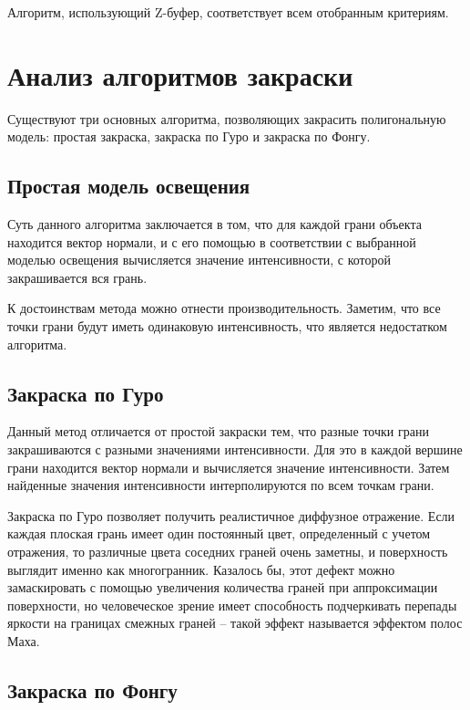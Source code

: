 Алгоритм, использующий Z-буфер, соответствует всем отобранным критериям.

\section{Анализ алгоритмов закраски}

Существуют три основных алгоритма, позволяющих закрасить полигональную модель: простая закраска, закраска по Гуро и закраска по Фонгу.

\subsection{Простая модель освещения}

Суть данного алгоритма заключается в том, что для каждой грани объекта находится вектор нормали, и с его помощью в соответствии с выбранной моделью освещения вычисляется значение интенсивности, с которой закрашивается вся грань. \cite{Dunn}

К достоинствам метода можно отнести производительность.
Заметим, что все точки грани будут иметь одинаковую интенсивность, что является недостатком алгоритма.

\subsection{Закраска по Гуро}

Данный метод отличается от простой закраски тем, что разные точки грани закрашиваются с разными значениями интенсивности.
Для это в каждой вершине грани находится вектор нормали и вычисляется значение интенсивности. Затем найденные значения интенсивности интерполируются по всем точкам грани. \cite{Dunn}

Закраска по Гуро позволяет получить реалистичное диффузное отражение.
Если каждая плоская грань имеет один постоянный цвет, определенный с учетом отражения, то различные цвета соседних граней очень заметны, и поверхность выглядит именно как многогранник.
Казалось бы, этот дефект можно замаскировать с помощью увеличения количества граней при аппроксимации поверхности, но человеческое зрение имеет способность подчеркивать перепады яркости на границах смежных граней – такой эффект называется эффектом полос Маха.


\subsection{Закраска по Фонгу}

